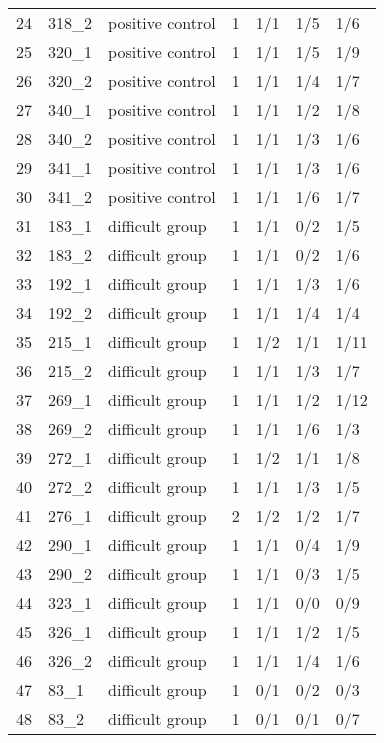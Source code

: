 \begin{table}[ht]
\begin{tabular}{rllrlll}
  24 & 318\_2 & positive control &   1 & 1/1 & 1/5 & 1/6 \\ 
  25 & 320\_1 & positive control &   1 & 1/1 & 1/5 & 1/9 \\ 
  26 & 320\_2 & positive control &   1 & 1/1 & 1/4 & 1/7 \\ 
  27 & 340\_1 & positive control &   1 & 1/1 & 1/2 & 1/8 \\ 
  28 & 340\_2 & positive control &   1 & 1/1 & 1/3 & 1/6 \\ 
  29 & 341\_1 & positive control &   1 & 1/1 & 1/3 & 1/6 \\ 
  30 & 341\_2 & positive control &   1 & 1/1 & 1/6 & 1/7 \\ 
  31 & 183\_1 & difficult group &   1 & 1/1 & 0/2 & 1/5 \\ 
  32 & 183\_2 & difficult group &   1 & 1/1 & 0/2 & 1/6 \\ 
  33 & 192\_1 & difficult group &   1 & 1/1 & 1/3 & 1/6 \\ 
  34 & 192\_2 & difficult group &   1 & 1/1 & 1/4 & 1/4 \\ 
  35 & 215\_1 & difficult group &   1 & 1/2 & 1/1 & 1/11 \\ 
  36 & 215\_2 & difficult group &   1 & 1/1 & 1/3 & 1/7 \\ 
  37 & 269\_1 & difficult group &   1 & 1/1 & 1/2 & 1/12 \\ 
  38 & 269\_2 & difficult group &   1 & 1/1 & 1/6 & 1/3 \\ 
  39 & 272\_1 & difficult group &   1 & 1/2 & 1/1 & 1/8 \\ 
  40 & 272\_2 & difficult group &   1 & 1/1 & 1/3 & 1/5 \\ 
  41 & 276\_1 & difficult group &   2 & 1/2 & 1/2 & 1/7 \\ 
  42 & 290\_1 & difficult group &   1 & 1/1 & 0/4 & 1/9 \\ 
  43 & 290\_2 & difficult group &   1 & 1/1 & 0/3 & 1/5 \\ 
  44 & 323\_1 & difficult group &   1 & 1/1 & 0/0 & 0/9 \\ 
  45 & 326\_1 & difficult group &   1 & 1/1 & 1/2 & 1/5 \\ 
  46 & 326\_2 & difficult group &   1 & 1/1 & 1/4 & 1/6 \\ 
  47 & 83\_1 & difficult group &   1 & 0/1 & 0/2 & 0/3 \\ 
  48 & 83\_2 & difficult group &   1 & 0/1 & 0/1 & 0/7 \\ 
   \hline
\end{tabular}
\end{table}

